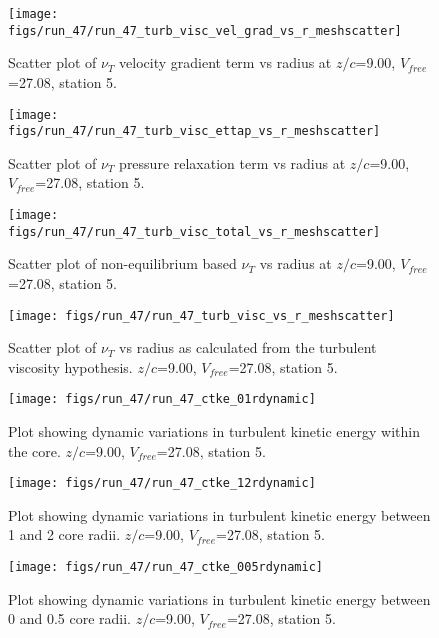 \begin{figure}[H]
\centering
\texttt{[image: figs/run\_47/run\_47\_turb\_visc\_vel\_grad\_vs\_r\_meshscatter]}
\caption{Scatter plot of $\nu_T$ velocity gradient term vs radius at $z/c$=9.00, $V_{free}$=27.08, station 5.}
\end{figure}


\begin{figure}[H]
\centering
\texttt{[image: figs/run\_47/run\_47\_turb\_visc\_ettap\_vs\_r\_meshscatter]}
\caption{Scatter plot of $\nu_T$ pressure relaxation term vs radius at $z/c$=9.00, $V_{free}$=27.08, station 5.}
\end{figure}


\begin{figure}[H]
\centering
\texttt{[image: figs/run\_47/run\_47\_turb\_visc\_total\_vs\_r\_meshscatter]}
\caption{Scatter plot of non-equilibrium based $\nu_T$ vs radius at $z/c$=9.00, $V_{free}$=27.08, station 5.}
\end{figure}


\begin{figure}[H]
\centering
\texttt{[image: figs/run\_47/run\_47\_turb\_visc\_vs\_r\_meshscatter]}
\caption{Scatter plot of $\nu_T$ vs radius as calculated from the turbulent viscosity hypothesis. $z/c$=9.00, $V_{free}$=27.08, station 5.}
\end{figure}


\begin{figure}[H]
\centering
\texttt{[image: figs/run\_47/run\_47\_ctke\_01rdynamic]}
\caption{Plot showing dynamic variations in turbulent kinetic energy within the core. $z/c$=9.00, $V_{free}$=27.08, station 5.}
\end{figure}


\begin{figure}[H]
\centering
\texttt{[image: figs/run\_47/run\_47\_ctke\_12rdynamic]}
\caption{Plot showing dynamic variations in turbulent kinetic energy between 1 and 2 core radii. $z/c$=9.00, $V_{free}$=27.08, station 5.}
\end{figure}


\begin{figure}[H]
\centering
\texttt{[image: figs/run\_47/run\_47\_ctke\_005rdynamic]}
\caption{Plot showing dynamic variations in turbulent kinetic energy between 0 and 0.5 core radii. $z/c$=9.00, $V_{free}$=27.08, station 5.}
\end{figure}


